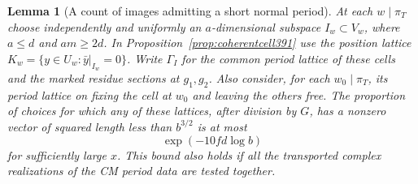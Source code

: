 \documentclass[a4paper,11pt]{article}
\newtheorem{lemma}[proposition]{Lemma}
\theoremstyle{definition}
\theoremstyle{remark}
\numberwithin{equation}{section}
\begin{document}
\begin{lemma}[A count of images admitting a short normal period]
\label{lem:shortimage392}
At each \(w\mid\pi_T\) choose independently and uniformly
an \(a\)-dimensional subspace \(I_w\subset V_w\), where
\(a\le d\) and \(am\ge2d\). In
Proposition~\ref{prop:coherentcell391} use the position lattice
\(K_w=\{y\in U_w:\bar y|_{I_w}=0\}\). Write \(\Gamma_I\)
for the common period lattice of these cells and the marked
residue sections at \(g_1,g_2\). Also consider, for each
\(w_0\mid\pi_T\), its period lattice on fixing the cell
at \(w_0\) and leaving the others free. The proportion of
choices for which any of these lattices, after division by
\(G\), has a nonzero vector of squared length less than
\(b^{3/2}\) is at most
\[
                    \exp(-10fd\log b)
\]
for sufficiently large \(x\). This bound also holds if all
the transported complex realizations of the CM period data
are tested together.
\end{lemma}
\end{document}
